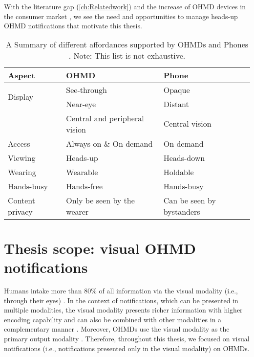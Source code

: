 With the literature gap (\autoref{ch:Relatedwork}) and the increase of OHMD devices in the consumer market \cite{alsop_ar_2022}, we see the need and opportunities to manage heads-up OHMD notifications that motivate this thesis.



\begin{table}[htbp]
\centering
\caption[Affordances of OHMDs vs Phones]{A Summary of different affordances supported by OHMDs and Phones \cite{janaka_glassmessaging_2023, stephanidis_properties_2015, zhu_bishare_2020, vadas_reading_2006, zhou_ubiquitous_2019}. Note: This list is not exhaustive. }
\begin{tabular}{@{}lll@{}}
\toprule
\textbf{Aspect} & \textbf{OHMD} &\textbf{Phone} \\ \midrule
\multirow{2}{*}{Display} & See-through & Opaque \\
 & Near-eye & Distant \\ 
 & Central and peripheral vision & Central vision  \\ \midrule
Access & Always-on \& On-demand & On-demand \\ \midrule
Viewing & Heads-up & Heads-down \\ \midrule
Wearing & Wearable & Holdable \\ \midrule
Hands-busy & Hands-free & Hands-busy \\ \midrule
Content privacy & Only be seen by the wearer &  Can be seen by bystanders \\
\bottomrule
\end{tabular}
\label{tab:intro:ohmd_phone_affordance}
\end{table}



\section{Thesis scope: visual OHMD notifications}
\label{sec:Intro:thesis_scope}

Humans intake more than 80\% of all information via the visual modality (i.e., through their eyes) \cite{rosenblum2011see}. In the context of notifications, which can be presented in multiple modalities, the visual modality presents richer information with higher encoding capability and can also be combined with other modalities in a complementary manner \cite{hsia_information_1971, rau_modality_2019}. Moreover, OHMDs use the visual modality as the primary output modality \cite{itoh_towards_2021, milgram_taxonomy_1994, azuma_survey_1997}. Therefore, throughout this thesis, we focused on visual notifications (i.e., notifications presented only in the visual modality) on OHMDs.


